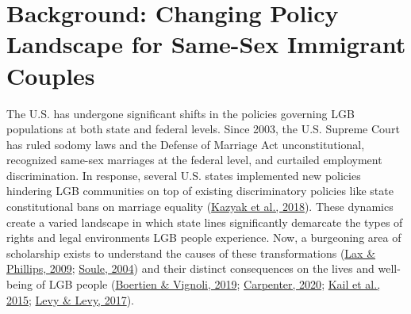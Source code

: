 \documentclass[
  11pt,
]{article}
\begin{document}
\hypertarget{background-changing-policy-landscape-for-same-sex-immigrant-couples}{%
\section{Background: Changing Policy Landscape for Same-Sex Immigrant Couples}\label{background-changing-policy-landscape-for-same-sex-immigrant-couples}}

The U.S. has undergone significant shifts in the policies governing LGB populations at both state and federal levels. Since 2003, the U.S. Supreme Court has ruled sodomy laws and the Defense of Marriage Act unconstitutional, recognized same-sex marriages at the federal level, and curtailed employment discrimination. In response, several U.S. states implemented new policies hindering LGB communities on top of existing discriminatory policies like state constitutional bans on marriage equality (\protect\hyperlink{ref-kazyak_2018}{Kazyak et al., 2018}). These dynamics create a varied landscape in which state lines significantly demarcate the types of rights and legal environments LGB people experience. Now, a burgeoning area of scholarship exists to understand the causes of these transformations (\protect\hyperlink{ref-lax_2009}{Lax \& Phillips, 2009}; \protect\hyperlink{ref-soule_2004}{Soule, 2004}) and their distinct consequences on the lives and well-being of LGB people (\protect\hyperlink{ref-boertien_2019}{Boertien \& Vignoli, 2019}; \protect\hyperlink{ref-carpenter_2020}{Carpenter, 2020}; \protect\hyperlink{ref-kail_2015}{Kail et al., 2015}; \protect\hyperlink{ref-levy_2017}{Levy \& Levy, 2017}).
\end{document}
